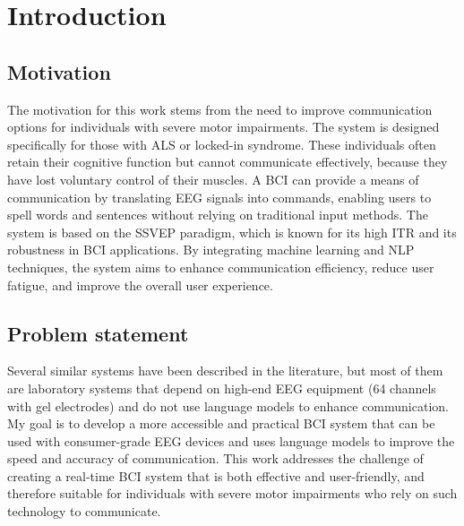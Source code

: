 
\chapter{Introduction}
\label{ch:introduction}

\section{Motivation}
\label{sec:motivation}

The motivation for this work stems from the need to improve communication options for
individuals with severe motor impairments. The system is designed specifically for
those with \ac{ALS} or locked-in syndrome. These individuals often retain their cognitive
function but cannot communicate effectively, because they have lost voluntary control of
their muscles. A \ac{BCI} can provide a means of communication by translating \ac{EEG}
signals into commands, enabling users to spell words and sentences without relying on
traditional input methods. The system is based on the \ac{SSVEP} paradigm, which is known
for its high \ac{ITR} and its robustness in \ac{BCI} applications. By integrating machine
learning and \ac{NLP} techniques, the system aims to enhance communication efficiency,
reduce user fatigue, and improve the overall user experience.

\section{Problem statement}
\label{sec:problem}

Several similar systems have been described in the literature, but most of them are
laboratory systems that depend on high-end \ac{EEG} equipment (64 channels with gel
electrodes) and do not use language models to enhance communication. My goal is to
develop a more accessible and practical \ac{BCI} system that can be used with
consumer-grade \ac{EEG} devices and uses language models to improve the speed and accuracy
of communication. This work addresses the challenge of creating a real-time \ac{BCI}
system that is both effective and user-friendly, and therefore suitable for individuals
with severe motor impairments who rely on such technology to communicate.

